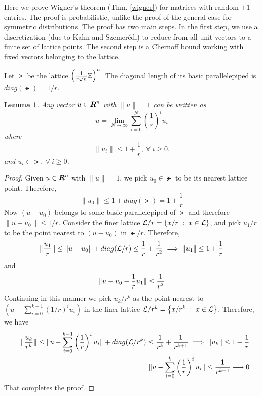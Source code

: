 \documentclass{book}
\newtheorem{lemma}[theorem]{Lemma}
\numberwithin{exercise}{chapter}
\begin{document}
Here we prove Wigner's theorem (Thm. \ref{wigner}) for matrices with random $\pm 1$ entries. The proof is probabilistic,
unlike the proof of the general case for symmetric distributions.
The proof has two main steps. In the first step, we use
a discretization (due to Kahn and Szemer\'{e}di) to reduce from all unit vectors to a finite set of lattice points. The second step is a
Chernoff bound working with fixed vectors belonging to the lattice.

Let $\lat$ be the lattice $\left( \frac{1}{r\sqrt{n}} \mathbb{Z}
\right)^{n}$. The diagonal length of its basic parallelepiped is
$diag(\lat) = 1/r$.

\begin{lemma} \label{lem:linear-combination}
Any vector $u \in \mbox{\mbox{\boldmath $R$}}^{n}$ with $\|u\| = 1$ can be written as
\[
u = \lim_{N \rightarrow \infty} \sum_{i=0}^{N} \left( \frac{1}{r}
\right)^{i} u_{i}
\]
where
\[
\|u_{i}\| \leq 1 + \frac{1}{r},~ \forall~ i \geq 0.
\]
and $u_{i} \in \lat,~ \forall~ i \geq 0$.
\end{lemma}

\begin{proof}
Given $u \in \mbox{\mbox{\boldmath $R$}}^{n}$ with $\|u\| = 1$, we pick $u_{0} \in
\lat$ to be its nearest lattice point. Therefore,
\[
\|u_{0}\| \leq 1 + diag(\lat) = 1 +
\frac{1}{r}
\]
Now $(u - u_{0})$ belongs to some basic parallelepiped of $\lat$
and therefore $\|u - u_{0}\| \leq 1/r$. Consider the finer
lattice ${\cal L}/r = \left\{ x/r \;:\; x \in {\cal L} \right\}$, and
pick $u_{1}/r$ to be the point nearest to $(u - u_{0})$ in
$\lat/r$. Therefore,
\[
\|\frac{u_{1}}{r}\| \leq {\| u - u_{0} \|} + diag({\cal L}/r)
\leq \frac{1}{r} + \frac{1}{r^{2}} \implies {\| u_{1} \|} \leq 1 +
\frac{1}{r}
\]
and
\[
{\| u - u_{0} - \frac{1}{r} u_{1} \|} \leq \frac{1}{r^{2}}
\]
Continuing in this manner we pick $u_{k}/r^{k}$ as the point
nearest to $\left( u - \sum_{i=0}^{k-1} (1/r)^{i} u_{i} \right)$
in the finer lattice ${\cal L}/r^{k} = \left\{ x/r^{k} \;:\; x \in
{\cal L} \right\}$. Therefore, we have
\begin{eqnarray*}
&& {\| \frac{u_{k}}{r^{k}} \|} \leq {\| u - \sum_{i=0}^{k-1}
\left( \frac{1}{r} \right)^{i} u_{i} \|} + diag({\cal L}/r^{k}) \leq
\frac{1}{r^{k}} + \frac{1}{r^{k+1}} \implies {\| u_{k} \|} \leq 1
+ \frac{1}{r} \\
&& {\| u - \sum_{i=0}^{k} \left( \frac{1}{r} \right)^{i} u_{i} \|}
\leq \frac{1}{r^{k+1}} \longrightarrow 0
\end{eqnarray*}
That completes the proof.
\end{proof}
\end{document}
